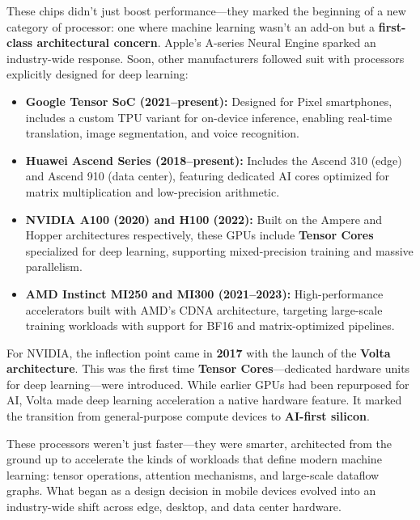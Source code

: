 \noindent These chips didn’t just boost performance—they marked the beginning of a new category of processor: one where machine learning wasn’t an add-on but a \textbf{first-class architectural concern}. Apple’s A-series Neural Engine sparked an industry-wide response. Soon, other manufacturers followed suit with processors explicitly designed for deep learning:

\begin{itemize}
    \item \textbf{Google Tensor SoC (2021–present):} Designed for Pixel smartphones, includes a custom TPU variant for on-device inference, enabling real-time translation, image segmentation, and voice recognition.
    
    \item \textbf{Huawei Ascend Series (2018–present):} Includes the Ascend 310 (edge) and Ascend 910 (data center), featuring dedicated AI cores optimized for matrix multiplication and low-precision arithmetic.
    
    \item \textbf{NVIDIA A100 (2020) and H100 (2022):} Built on the Ampere and Hopper architectures respectively, these GPUs include \textbf{Tensor Cores} specialized for deep learning, supporting mixed-precision training and massive parallelism.
    
    \item \textbf{AMD Instinct MI250 and MI300 (2021–2023):} High-performance accelerators built with AMD's CDNA architecture, targeting large-scale training workloads with support for BF16 and matrix-optimized pipelines.
\end{itemize}

\noindent For NVIDIA, the inflection point came in \textbf{2017} with the launch of the \textbf{Volta architecture}. This was the first time \textbf{Tensor Cores}—dedicated hardware units for deep learning—were introduced. While earlier GPUs had been repurposed for AI, Volta made deep learning acceleration a native hardware feature. It marked the transition from general-purpose compute devices to \textbf{AI-first silicon}.

\medskip

\noindent These processors weren’t just faster—they were smarter, architected from the ground up to accelerate the kinds of workloads that define modern machine learning: tensor operations, attention mechanisms, and large-scale dataflow graphs. What began as a design decision in mobile devices evolved into an industry-wide shift across edge, desktop, and data center hardware.

